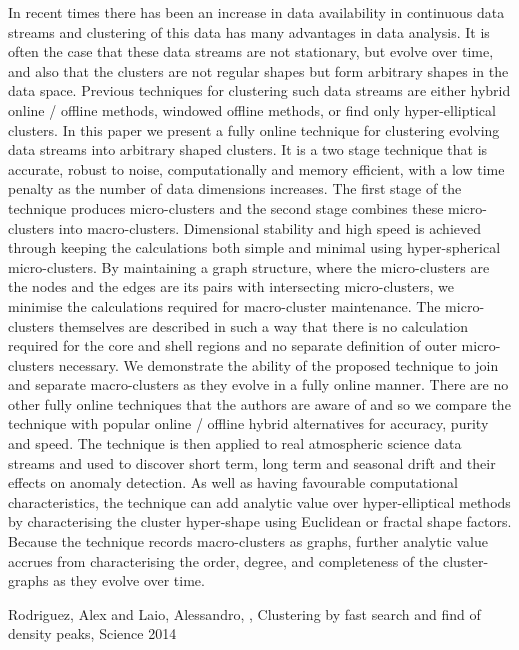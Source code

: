 In recent times there has been an increase in data availability in continuous data streams and clustering of this data has many advantages in data analysis. It is often the case that these data streams are not stationary, but evolve over time, and also that the clusters are not regular shapes but form arbitrary shapes in the data space. Previous techniques for clustering such data streams are either hybrid online / offline methods, windowed offline methods, or find only hyper-elliptical clusters. In this paper we present a fully online technique for clustering evolving data streams into arbitrary shaped clusters. It is a two stage technique that is accurate, robust to noise, computationally and memory efficient, with a low time penalty as the number of data dimensions increases. The first stage of the technique produces micro-clusters and the second stage combines these micro-clusters into macro-clusters. Dimensional stability and high speed is achieved through keeping the calculations both simple and minimal using hyper-spherical micro-clusters. By maintaining a graph structure, where the micro-clusters are the nodes and the edges are its pairs with intersecting micro-clusters, we minimise the calculations required for macro-cluster maintenance. The micro-clusters themselves are described in such a way that there is no calculation required for the core and shell regions and no separate definition of outer micro-clusters necessary. We demonstrate the ability of the proposed technique to join and separate macro-clusters as they evolve in a fully online manner. There are no other fully online techniques that the authors are aware of and so we compare the technique with popular online / offline hybrid alternatives for accuracy, purity and speed. The technique is then applied to real atmospheric science data streams and used to discover short term, long term and seasonal drift and their effects on anomaly detection. As well as having favourable computational characteristics, the technique can add analytic value over hyper-elliptical methods by characterising the cluster hyper-shape using Euclidean or fractal shape factors. Because the technique records macro-clusters as graphs, further analytic value accrues from characterising the order, degree, and completeness of the cluster-graphs as they evolve over time.


Rodriguez, Alex and Laio, Alessandro, \cite{RodriguezLaio2014-5691}, Clustering by fast search and find of density peaks, Science 2014 

